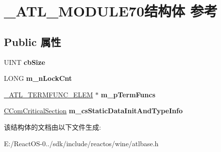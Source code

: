 \hypertarget{struct___a_t_l___m_o_d_u_l_e70}{}\section{\+\_\+\+A\+T\+L\+\_\+\+M\+O\+D\+U\+L\+E70结构体 参考}
\label{struct___a_t_l___m_o_d_u_l_e70}
\subsection*{Public 属性}
\begin{DoxyCompactItemize}
\item 
\mbox{\label{struct___a_t_l___m_o_d_u_l_e70_a9b72cc56d2f46eb28cbc8a88e2bbf603}} 
U\+I\+NT {\bfseries cb\+Size}
\item 
\mbox{\label{struct___a_t_l___m_o_d_u_l_e70_a825bc72547c7b92b4b93d3587665d73a}} 
L\+O\+NG {\bfseries m\+\_\+n\+Lock\+Cnt}
\item 
\mbox{\label{struct___a_t_l___m_o_d_u_l_e70_a9b77bff9b3298aeebae18b37c0a7fba2}} 
\hyperlink{struct___a_t_l___t_e_r_m_f_u_n_c___e_l_e_m___t_a_g}{\+\_\+\+A\+T\+L\+\_\+\+T\+E\+R\+M\+F\+U\+N\+C\+\_\+\+E\+L\+EM} $\ast$ {\bfseries m\+\_\+p\+Term\+Funcs}
\item 
\mbox{\label{struct___a_t_l___m_o_d_u_l_e70_a7b1eee1f209e5e8a27c864193a857e23}} 
\hyperlink{struct___c_r_i_t_i_c_a_l___s_e_c_t_i_o_n}{C\+Com\+Critical\+Section} {\bfseries m\+\_\+cs\+Static\+Data\+Init\+And\+Type\+Info}
\end{DoxyCompactItemize}


该结构体的文档由以下文件生成\+:\begin{DoxyCompactItemize}
\item 
E\+:/\+React\+O\+S-\/0../sdk/include/reactos/wine/atlbase.\+h\end{DoxyCompactItemize}
